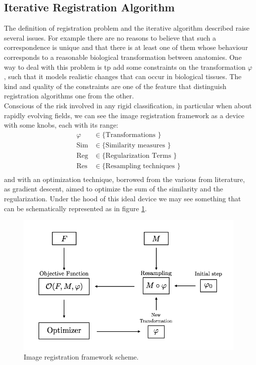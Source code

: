 \subsection{Iterative Registration Algorithm}

The definition of registration problem and the iterative algorithm described raise several issues. For example there are no reasons to believe that such a correspondence is unique and that there is at least one of them whose behaviour corresponds to a reasonable biological transformation between anatomies. One way to deal with this problem is tp add some constraints on the transformation $\varphi$, such that it models realistic changes that can occur in biological tissues. The kind and quality of the constraints are one of the feature that distinguish registration algorithms one from the other. \\
Conscious of the risk involved in any rigid classification, in particular when about rapidly evolving fields, we can see the image registration framework as a device with some knobs, each with its range:
\begin{align*}
\varphi &\in \{ \text{Transformations }\}\\
\text{Sim} &\in \{ \text{Similarity measures }\}\\
\text{Reg} &\in \{ \text{Regularization Terms }\}\\
\text{Res} &\in \{ \text{Resampling techniques }\}\\
\end{align*}
and with an optimization technique, borrowed from the various from literature, as gradient descent, aimed to optimize the sum of the similarity and the regularization.
Under the hood of this ideal device we may see something that can be schematically represented as in figure \ref{fig:iterative_algorithm_scheme}.

\begin{figure}[!ht]
	\centering
	\includegraphics[scale=0.35]{figures/iterative_algorithm.png}
	\caption{Image registration framework scheme.}
	\label{fig:iterative_algorithm_scheme}
\end{figure}

